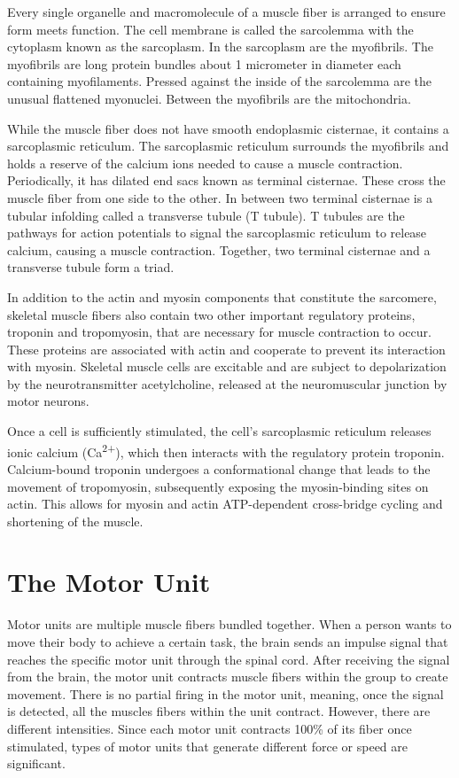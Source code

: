 \documentclass[]{book}
\begin{document}
Every single organelle and macromolecule of a muscle fiber is arranged to ensure form meets function. The cell membrane is called the sarcolemma with the cytoplasm known as the sarcoplasm. In the sarcoplasm are the myofibrils. The myofibrils are long protein bundles about 1 micrometer in diameter each containing myofilaments. Pressed against the inside of the sarcolemma are the unusual flattened myonuclei. Between the myofibrils are the mitochondria.

While the muscle fiber does not have smooth endoplasmic cisternae, it contains a sarcoplasmic reticulum. The sarcoplasmic reticulum surrounds the myofibrils and holds a reserve of the calcium ions needed to cause a muscle contraction. Periodically, it has dilated end sacs known as terminal cisternae. These cross the muscle fiber from one side to the other. In between two terminal cisternae is a tubular infolding called a transverse tubule (T tubule). T tubules are the pathways for action potentials to signal the sarcoplasmic reticulum to release calcium, causing a muscle contraction. Together, two terminal cisternae and a transverse tubule form a triad.

In addition to the actin and myosin components that constitute the sarcomere, skeletal muscle fibers also contain two other important regulatory proteins, troponin and tropomyosin, that are necessary for muscle contraction to occur. These proteins are associated with actin and cooperate to prevent its interaction with myosin. Skeletal muscle cells are excitable and are subject to depolarization by the neurotransmitter acetylcholine, released at the neuromuscular junction by motor neurons.

Once a cell is sufficiently stimulated, the cell's sarcoplasmic reticulum releases ionic calcium (Ca\textsuperscript{2+}), which then interacts with the regulatory protein troponin. Calcium-bound troponin undergoes a conformational change that leads to the movement of tropomyosin, subsequently exposing the myosin-binding sites on actin. This allows for myosin and actin ATP-dependent cross-bridge cycling and shortening of the muscle.

\hypertarget{the-motor-unit}{%
\section{The Motor Unit}\label{the-motor-unit}}

Motor units are multiple muscle fibers bundled together. When a person wants to move their body to achieve a certain task, the brain sends an impulse signal that reaches the specific motor unit through the spinal cord. After receiving the signal from the brain, the motor unit contracts muscle fibers within the group to create movement. There is no partial firing in the motor unit, meaning, once the signal is detected, all the muscles fibers within the unit contract. However, there are different intensities. Since each motor unit contracts 100\% of its fiber once stimulated, types of motor units that generate different force or speed are significant.
\end{document}
